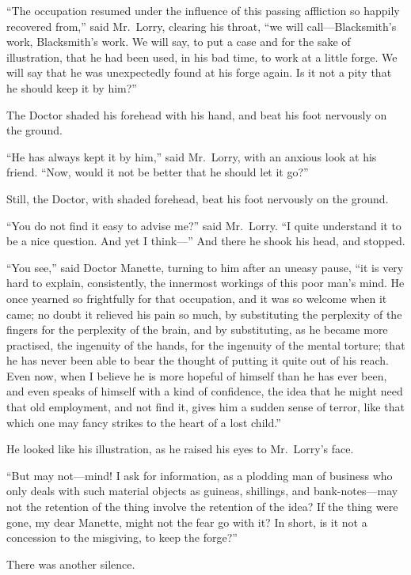 ``The occupation resumed under the influence of this passing affliction
so happily recovered from,'' said Mr.\ Lorry, clearing his throat, ``we will
call---Blacksmith's work, Blacksmith's work.  We will say, to put a case
and for the sake of illustration, that he had been used, in his bad time,
to work at a little forge.  We will say that he was unexpectedly found
at his forge again.  Is it not a pity that he should keep it by him?''

The Doctor shaded his forehead with his hand, and beat his foot nervously
on the ground.

``He has always kept it by him,'' said Mr.\ Lorry, with an anxious look
at his friend.  ``Now, would it not be better that he should let it go?''

Still, the Doctor, with shaded forehead, beat his foot nervously on
the ground.

``You do not find it easy to advise me?'' said Mr.\ Lorry.  ``I quite
understand it to be a nice question.  And yet I think---'' And there he
shook his head, and stopped.

``You see,'' said Doctor Manette, turning to him after an uneasy pause,
``it is very hard to explain, consistently, the innermost workings of
this poor man's mind.  He once yearned so frightfully for that
occupation, and it was so welcome when it came; no doubt it relieved
his pain so much, by substituting the perplexity of the fingers for
the perplexity of the brain, and by substituting, as he became more
practised, the ingenuity of the hands, for the ingenuity of the
mental torture; that he has never been able to bear the thought of
putting it quite out of his reach.  Even now, when I believe he is
more hopeful of himself than he has ever been, and even speaks of
himself with a kind of confidence, the idea that he might need that
old employment, and not find it, gives him a sudden sense of terror,
like that which one may fancy strikes to the heart of a lost child.''

He looked like his illustration, as he raised his eyes to
Mr.\ Lorry's face.

``But may not---mind!  I ask for information, as a plodding man of
business who only deals with such material objects as guineas,
shillings, and bank-notes---may not the retention of the thing involve
the retention of the idea?  If the thing were gone, my dear Manette,
might not the fear go with it?  In short, is it not a concession to
the misgiving, to keep the forge?''

There was another silence.

